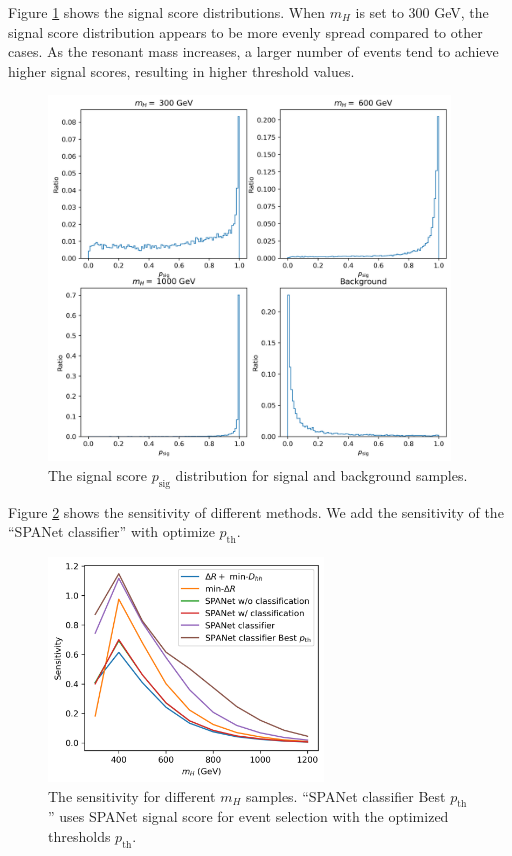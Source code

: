 \documentclass[12pt]{article}
\begin{document}
		Figure \ref{fig:signal_score} shows the signal score distributions. When $m_H$ is set to 300 GeV, the signal score distribution appears to be more evenly spread compared to other cases. As the resonant mass increases, a larger number of events tend to achieve higher signal scores, resulting in higher threshold values.
		\begin{figure}[htpb]
			\centering
			\includegraphics[width=0.95\textwidth]{signal_score.png}
			\caption{The signal score $p_{\text{sig}}$ distribution for signal and background samples.}
			\label{fig:signal_score}
		\end{figure}

		Figure \ref{fig:sensitivity_mass_SPANET_classifier_best_th} shows the sensitivity of different methods. We add the sensitivity of the ``SPANet classifier'' with optimize $p_\text{th}$.
		\begin{figure}[htpb]
			\centering
			\includegraphics[width=0.65\textwidth]{sensitivity_mass-DHH_mindR-SPANet-classifier-best-th.png}
			\caption{The sensitivity for different $m_H$ samples. ``SPANet classifier Best $p_{\text{th}}$'' uses SPANet signal score for event selection with the optimized  thresholds $p_{\text{th}}$.}
			\label{fig:sensitivity_mass_SPANET_classifier_best_th}
		\end{figure}
\end{document}
